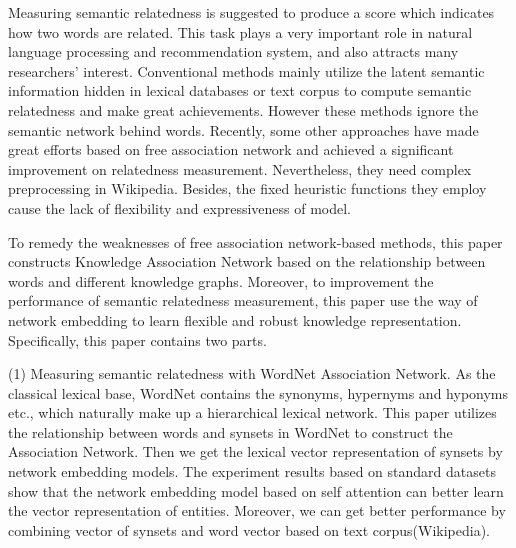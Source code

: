 \begin{englishabstract}


    Measuring semantic relatedness is suggested to produce a score which indicates how two words are related. This task plays a very important role in natural language processing and recommendation system, and also attracts many researchers' interest. Conventional methods mainly utilize the latent semantic information hidden in lexical databases or text corpus to compute semantic relatedness and make great achievements. However these methods ignore the semantic network behind words. Recently, some other approaches have made great efforts based on free association network and achieved a significant improvement on relatedness measurement. Nevertheless, they need complex preprocessing in Wikipedia. Besides, the fixed heuristic functions they employ cause the lack of flexibility and expressiveness of model. 

    To remedy the weaknesses of free association network-based methods, this paper constructs Knowledge Association Network based on the relationship between words and different knowledge graphs. Moreover, to improvement the performance of semantic relatedness measurement, this paper use the way of network embedding to learn flexible and robust knowledge representation. Specifically, this paper contains two parts.
  
    (1) Measuring semantic relatedness with WordNet Association Network. As the classical lexical base, WordNet contains the synonyms, hypernyms and hyponyms etc., which naturally make up a hierarchical lexical network. This paper utilizes the relationship between words and synsets in WordNet to construct the Association Network. Then we get the lexical vector representation of synsets by network embedding models. The experiment results based on standard datasets show that the network embedding model based on self attention can better learn the vector representation of entities. Moreover, we can get better performance by combining vector of synsets and word vector based on text corpus(Wikipedia).
  

\end{englishabstract}
